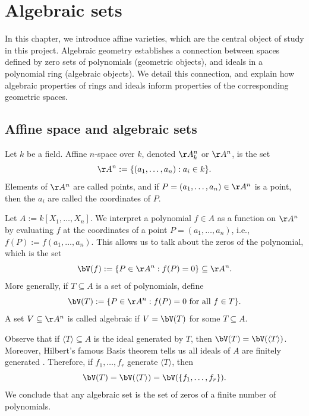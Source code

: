 \documentclass[12pt]{amsart}
\theoremstyle{plain}
\theoremstyle{definition}
\begin{document}
\newpage
{}
\section{Algebraic sets}\label{chapter:algebraicsets}
In this chapter, we introduce affine varieties, which are the central object of study in this project.
Algebraic geometry establishes a connection between spaces defined by zero sets of polynomials (geometric objects), and ideals in a polynomial ring (algebraic objects).
We detail this connection, and explain how algebraic properties of rings and ideals inform properties of the corresponding geometric spaces.





\subsection{Affine space and algebraic sets}
Let $k$ be a field.
Affine $n$-space over $k$, denoted $\AA^n_k$ or $\AA^n$, is the set 
$$\AA^n := \{(a_1, \ldots, a_n) : a_i \in k\}.$$
Elements of $\AA^n$ are called points, and if $P = (a_1, \ldots, a_n) \in \AA^n$ is a point, then the $a_i$ are called the coordinates of $P$.

Let $A := k[X_1, \ldots, X_n]$.
We interpret a polynomial $f \in A$ as a function on $\AA^n$ by evaluating $f$ at the coordinates of a point $P = (a_1, \ldots, a_n)$, i.e., $f(P) := f(a_1, \ldots, a_n).$
This allows us to talk about the zeros of the polynomial, which is the set
$$\bV(f) := \{P \in \AA^n : f(P) = 0\} \subseteq \AA^n.$$
More generally, if $T \subseteq A$ is a set of polynomials, define
$$\bV(T) := \{P \in \AA^n : f(P) = 0 \text{ for all } f \in T\}.$$
A set $V \subseteq \AA^n$ is called algebraic if $V = \bV(T)$ for some $T \subseteq A$.

Observe that if $\langle T \rangle \subseteq A$ is the ideal generated by $T$, then $\bV(T) = \bV(\langle T \rangle)$.
Moreover, Hilbert's famous Basis theorem tells us all ideals of $A$ are finitely generated \cite[\S 3.6]{Reid95}.
Therefore, if $f_1, \ldots, f_r$ generate $\langle T \rangle$, then 
$$\bV(T) = \bV(\langle T \rangle) = \bV(\{f_1, \ldots, f_r\}).$$
We conclude that any algebraic set is the set of zeros of a finite number of polynomials.
\end{document}
